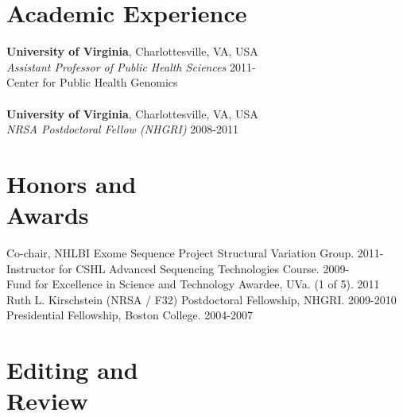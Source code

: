\documentclass[margin,line]{cv}
\begin{document}
\begin{resume}
    \section{\mysidestyle Academic Experience}

    \textbf{University of Virginia}, Charlottesville, VA, USA\\
    \textit{Assistant Professor of Public Health Sciences}                              \hfill 2011-\\
    Center for Public Health Genomics\\
    \\
    \textbf{University of Virginia}, Charlottesville, VA, USA\\
    \textit{NRSA Postdoctoral Fellow (NHGRI)}                                          \hfill 2008-2011\\


    \section{\mysidestyle Honors and\\Awards} 
    
    Co-chair, NHLBI Exome Sequence Project Structural Variation Group. 2011-                           \\\vspace{1mm}%
    Instructor for CSHL Advanced Sequencing Technologies Course. 2009-                                 \\\vspace{1mm}%
    Fund for Excellence in Science and Technology Awardee, UVa. (1 of 5). 2011                         \\\vspace{1mm}%
    Ruth L. Kirschstein (NRSA / F32) Postdoctoral Fellowship, NHGRI. 2009-2010                         \\\vspace{1mm}%
    Presidential Fellowship, Boston College. 2004-2007                                                               %
    
    
    \section{\mysidestyle Editing and\\Review} 
    

\end{resume}
\end{document}
